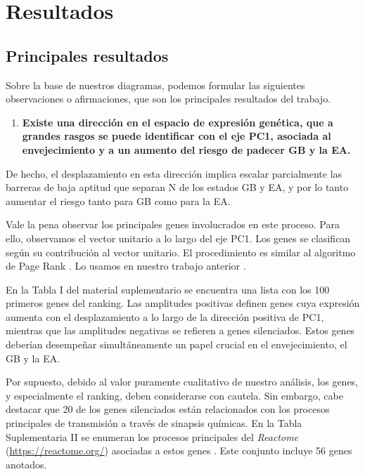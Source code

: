\chapter{Resultados}
\label{cap3}
\onehalfspacing

\section{Principales resultados}

Sobre la base de nuestros diagramas, podemos formular las siguientes observaciones o afirmaciones, que son los principales resultados del trabajo.

\begin{enumerate}
	\item  \textbf{Existe una dirección en el espacio de expresión genética, que a grandes rasgos se puede identificar con el eje PC1, asociada al envejecimiento y a un aumento del riesgo de padecer GB y la EA.}
\end{enumerate}

De hecho, el desplazamiento en esta dirección implica escalar parcialmente las barreras de baja aptitud que separan N de los estados GB y EA, y por lo tanto aumentar el riesgo tanto para GB como para la EA.

Vale la pena observar los principales genes involucrados en este proceso. Para ello, observamos el vector unitario a lo largo del eje PC1. Los genes se clasifican según su contribución al vector unitario. \alert{El procedimiento es similar al algoritmo de Page Rank \cite{Duhan_2009}. Lo usamos en nuestro trabajo anterior \cite{Gonzalez_2023}.}

\alert{En la Tabla I del material suplementario} se encuentra una lista con los 100 primeros genes del ranking. Las amplitudes positivas definen genes cuya expresión aumenta con el desplazamiento a lo largo de la dirección positiva de PC1, mientras que las amplitudes negativas se refieren a genes silenciados. Estos genes deberían desempeñar simultáneamente un papel crucial en el envejecimiento, el GB y la EA.

Por supuesto, debido al valor puramente cualitativo de nuestro análisis, los genes, y especialmente el ranking, deben considerarse con cautela. Sin embargo, cabe destacar que 20 de los genes silenciados están relacionados con los procesos principales de transmisión a través de sinapsis químicas. \alert{En la Tabla Suplementaria II} se enumeran los procesos principales del \textit{Reactome} (\href{https://reactome.org/}{https://reactome.org/}) asociadas a estos genes \cite{Gillespie_2021}. Este conjunto incluye 56 genes anotados.

